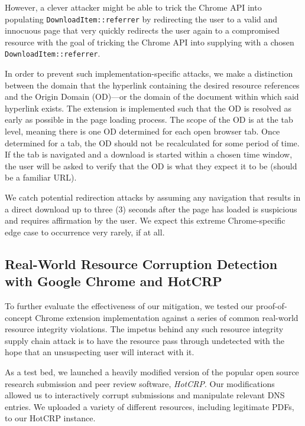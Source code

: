 However, a clever attacker might be able to trick the Chrome API into populating
\texttt{DownloadItem::referrer} by redirecting the user to a valid and innocuous
page that very quickly redirects the user again to a compromised resource with
the goal of tricking the Chrome API into supplying \SYSTEM{} with a chosen
\texttt{DownloadItem::referrer}.

In order to prevent such implementation-specific attacks, we make a distinction
between the domain that the hyperlink containing the desired resource references
and the Origin Domain (OD)---or the domain of the document within which said
hyperlink exists. The extension is implemented such that the OD is resolved as
early as possible in the page loading process. The scope of the OD is at the tab
level, meaning there is one OD determined for each open browser tab. Once
determined for a tab, the OD should not be recalculated for some period of time.
If the tab is navigated and a download is started within a chosen time window,
the user will be asked to verify that the OD is what they expect it to be
(should be a familiar URL).

We catch potential redirection attacks by assuming any navigation that results
in a direct download up to three (3) seconds after the page has loaded is
suspicious and requires affirmation by the user. We expect this extreme
Chrome-specific edge case to occurrence very rarely, if at all.

\subsection{Real-World Resource Corruption Detection with Google Chrome and HotCRP}


To further evaluate the effectiveness of our mitigation, we tested our
proof-of-concept \SYSTEM{} Chrome extension implementation against a series of
common real-world resource integrity violations. The impetus behind any such
resource integrity supply chain attack is to have the resource pass through
undetected with the hope that an unsuspecting user will interact with it.

As a test bed, we launched a heavily modified version of the popular open source
research submission and peer review software, \emph{HotCRP}. Our modifications
allowed us to interactively corrupt submissions and manipulate relevant DNS
entries. We uploaded a variety of different resources, including legitimate
PDFs, to our HotCRP instance.

